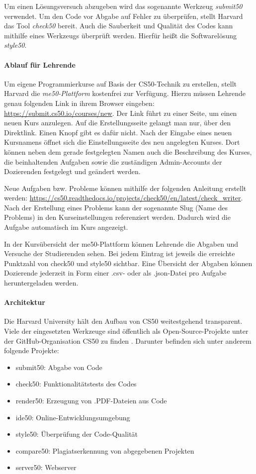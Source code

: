 Um einen Lösungsversuch abzugeben wird das sogenannte Werkzeug \emph{submit50}
verwendet. Um den Code vor Abgabe auf Fehler zu überprüfen, stellt Harvard das
Tool \emph{check50} bereit. Auch die Sauberkeit und Qualität des Codes kann
mithilfe eines Werkzeugs überprüft werden. Hierfür heißt die Softwarelösung
\emph{style50}. \parencite{submit50}

\paragraph{Ablauf für Lehrende}
Um eigene Programmierkurse auf Basis der CS50-Technik zu erstellen, stellt
Harvard die \emph{me50-Plattform} kostenfrei zur Verfügung. Hierzu müssen Lehrende
genau folgenden Link in ihrem Browser eingeben:
\url{https://submit.cs50.io/courses/new}. Der Link führt zu
einer Seite, um einen neuen Kurs anzulegen. Auf die Erstellungsseite gelangt man
nur, über den Direktlink. Einen Knopf gibt es dafür nicht. Nach der Eingabe
eines neuen Kursnamens öffnet sich die Einstellungsseite des neu angelegten
Kurses. Dort können neben dem gerade festgelegten Namen auch die Beschreibung
des Kurses, die beinhaltenden Aufgaben sowie die zuständigen Admin-Accounts der
Dozierenden festgelegt und geändert werden.

Neue Aufgaben bzw. Probleme können mithilfe der folgenden Anleitung
erstellt werden:
\url{https://cs50.readthedocs.io/projects/check50/en/latest/check_writer}. Nach
der Erstellung eines Problems kann der sogenannte Slug (Name des Problems) in
den Kurseinstellungen referenziert werden. Dadurch wird die Aufgabe automatisch
im Kurs angezeigt.

In der Kursübersicht der me50-Plattform können Lehrende die Abgaben und Versuche
der Studierenden sehen. Bei jedem Eintrag ist jeweils die erreichte Punktzahl
von check50 und style50 sichtbar. Eine Übersicht der Abgaben können Dozierende
jederzeit in Form einer .csv- oder als .json-Datei pro Aufgabe heruntergeladen
werden.

\paragraph{Architektur}
Die Harvard University hält den Aufbau von CS50 weitestgehend transparent.
Viele der eingesetzten Werkzeuge sind öffentlich als Open-Source-Projekte unter
der GitHub-Organisation \glqq CS50\grqq{} zu finden \parencite{cs50-github}.
Darunter befinden sich unter anderem folgende Projekte:
\begin{itemize}
\item submit50: Abgabe von Code
\item check50: Funktionalitätstests des Codes
\item render50: Erzeugung von .PDF-Dateien aus Code
\item ide50: Online-Entwicklungsumgebung
\item style50: Überprüfung der Code-Qualität
\item compare50: Plagiatserkennung von abgegebenen Projekten
\item server50: Webserver
\end{itemize}

